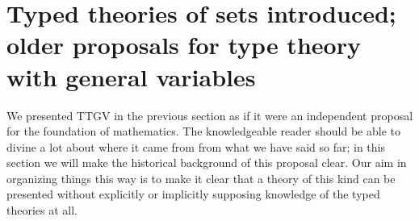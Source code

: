 \documentclass[12pt]{article}
\begin{document}
\begin{comment}
We do not see any general method of removing this failure of equivalence to typed formulas without special assumptions.

\item[Remark:]  For any typed sentence $\phi$, define $\phi^+$ as the result of replacing each type bound $\kappa(u)$ with $\kappa^2(u)$.  If the universal closure of $\phi$ is a theorem,
so is the universal closure of $\phi^+$;  the converse is not true.  This is a clarification of the polymorphism of this theory.  Now the following scheme strengthens this to $\phi \leftrightarrow \phi^+$:  the Ambiguity Scheme for TTGV asserts for each formula in which only $x$ is free, $(\forall uv:\phi[\kappa(u)/x] \leftrightarrow \phi[\kappa(v)/x])$.  This asserts
that all types look the same, in effect.  Consistency with TTGV of the ambiguity scheme for TTGV follows from the consistency of NFU;  we will review this in the next section.

An entertaining variant which seems to have the strength of the Axiom of Counting is, for any formula $\phi$ in which $x,y$ are the only free variables,
$$(\forall u:(\forall n \in {\mathbb N}_{\kappa^3(u)}:\phi[\kappa(u)/x;n/y] \leftrightarrow \phi[\kappa^2(u)/x;T(n)/y])).$$  This is unsatisfying in that we can't talk about all types at once in the same way as in the other scheme of ambiguity:  the problem is that we have no way to port natural numbers from one type to another if the types  are not connected by iterated applications of $\kappa$.  So one would want the unrestricted scheme of ambiguity as well.

Notice that the Ambiguity Scheme implies that every formula is equivalent to the partial universal closure of a typed formula, since it is a strengthening of one of the schemes which we know implies this.

\end{description}

\end{comment}

\newpage

\section{Typed theories of sets introduced;  older proposals for type theory with general variables}

We presented TTGV in the previous section as if it were an independent proposal for the foundation of mathematics.  The knowledgeable reader should be able to divine a lot about where it came from from what we have said so far;  in this section we will make the historical background of this proposal clear.  Our aim in organizing things this way is to make it clear that a theory of this kind can be presented without explicitly or implicitly supposing knowledge of the typed theories at all.  
\end{document}
